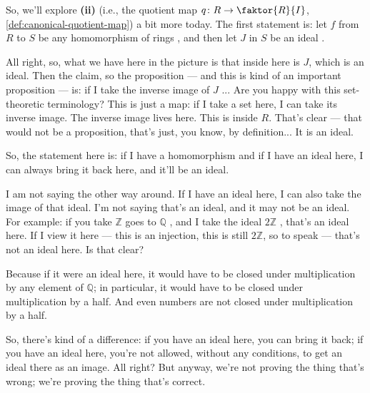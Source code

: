 \begin{speech}[00:08:04 - 00:10:25]
So, we'll explore \textbf{(ii)} (i.e., the quotient map $q \colon R \to \faktor{R}{I}$, \cref{def:canonical-quotient-map}) a bit more today. The first statement is: let $f$ from $R$ to $S$ be any homomorphism of rings , and then let $J$ in $S$ be an ideal .

All right, so, what we have here in the picture is that inside here is $J$, which is an ideal. Then the claim, so the proposition --- and this is kind of an important proposition --- is: if I take the inverse image of $J$ ... Are you happy with this set-theoretic terminology? This is just a map: if I take a set here, I can take its inverse image. The inverse image lives here. This is inside $R$. That's clear --- that would not be a proposition, that's just, you know, by definition... It is an ideal.

So, the statement here is: if I have a homomorphism and if I have an ideal here, I can always bring it back here, and it'll be an ideal.

I am not saying the other way around. If I have an ideal here, I can also take the image of that ideal. I'm not saying that's an ideal, and it may not be an ideal. For example: if you take $\mathbb{Z}$ goes to $\mathbb{Q}$ , and I take the ideal $2\mathbb{Z}$ , that's an ideal here. If I view it here --- this is an injection, this is still $2\mathbb{Z}$, so to speak  --- that's not an ideal here. Is that clear?

Because if it were an ideal here, it would have to be closed under multiplication by any element of $\mathbb{Q}$; in particular, it would have to be closed under multiplication by a half. And even numbers are not closed under multiplication by a half.

So, there's kind of a difference: if you have an ideal here, you can bring it back; if you have an ideal here, you're not allowed, without any conditions, to get an ideal there as an image. All right? But anyway, we're not proving the thing that's wrong; we're proving the thing that's correct.
\end{speech}

